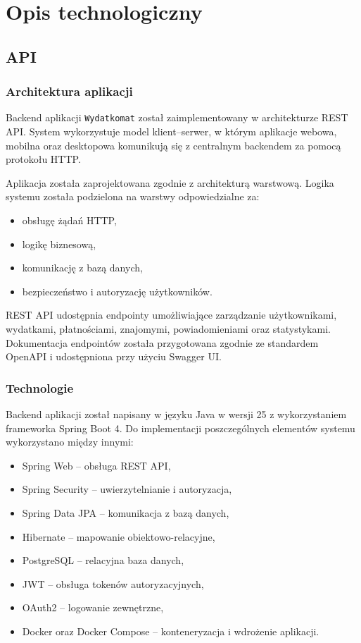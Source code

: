 \chapter{Opis technologiczny}

\section{API}

\subsection{Architektura aplikacji}

Backend aplikacji \verb|Wydatkomat| został zaimplementowany w architekturze REST API. System wykorzystuje model klient--serwer, w którym aplikacje webowa, mobilna oraz desktopowa komunikują się z centralnym backendem za pomocą protokołu HTTP.

Aplikacja została zaprojektowana zgodnie z architekturą warstwową. Logika systemu została podzielona na warstwy odpowiedzialne za:
\begin{itemize}
	\item obsługę żądań HTTP,
	\item logikę biznesową,
	\item komunikację z bazą danych,
	\item bezpieczeństwo i autoryzację użytkowników.
\end{itemize}

REST API udostępnia endpointy umożliwiające zarządzanie użytkownikami, wydatkami, płatnościami, znajomymi, powiadomieniami oraz statystykami. Dokumentacja endpointów została przygotowana zgodnie ze standardem OpenAPI i udostępniona przy użyciu Swagger UI.

\subsection{Technologie}

Backend aplikacji został napisany w języku Java w wersji 25 z wykorzystaniem frameworka Spring Boot 4. Do implementacji poszczególnych elementów systemu wykorzystano między innymi:
\begin{itemize}
	\item Spring Web -- obsługa REST API,
	\item Spring Security -- uwierzytelnianie i autoryzacja,
	\item Spring Data JPA -- komunikacja z bazą danych,
	\item Hibernate -- mapowanie obiektowo-relacyjne,
	\item PostgreSQL -- relacyjna baza danych,
	\item JWT -- obsługa tokenów autoryzacyjnych,
	\item OAuth2 -- logowanie zewnętrzne,
	\item Docker oraz Docker Compose -- konteneryzacja i wdrożenie aplikacji.
\end{itemize}


